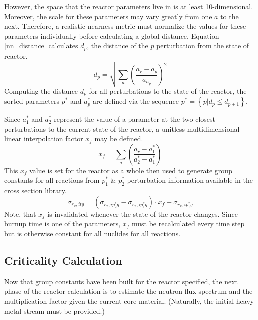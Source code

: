 However, the space that the reactor parameters live in is at least 10-dimensional.  Moreover, 
the scale for these parameters may vary greatly from one $a$ to the next.  Therefore, a realistic
nearness metric must normalize the values for these parameters individually before calculating a
global distance.  Equation \ref{nn_distance} calculates $d_p$, the distance of the $p$ 
perturbation from the state of reactor.
\begin{equation}
\label{nn_distance}
d_p = \sqrt{\sum_a \left(\frac{a_r - a_p}{a_{n_p}}\right)^2}
\end{equation}
Computing the distance $d_p$ for all perturbations to the state of the reactor, 
the sorted parameters $p^*$ and $a_p^*$ are defined via the sequence $p^* = \left\{p | d_p \le d_{p+1}\right\}$.

Since $a_1^*$ and $a_2^*$ represent the value of a parameter at the two closest perturbations to the
current state of the reactor, a unitless multidimensional linear interpolation factor $x_f$ may be defined.
\begin{equation}
\label{x_factor}
x_f = \sum_a \left(\frac{a_r - a_1^*}{a_2^* - a_1^*}\right)
\end{equation}
This $x_f$ value is set for the reactor as a whole then used to generate group constants for 
all reactions from $p_1^*$ \& $p_2^*$ perturbation information available in the cross section library. 
\begin{equation}
\label{sig_multi_interp}
\sigma_{r_x,itg} = (\sigma_{r_x,ip_2^*g} - \sigma_{r_x,ip_1^*g}) \cdot x_f  + \sigma_{r_x,ip_1^*g}
\end{equation}
Note, that $x_f$ is invalidated whenever the state of the reactor changes.  Since burnup time is one of 
the parameters, $x_f$ must be recalculated every time step but is otherwise constant for all nuclides
for all reactions.


\subsection{Criticality Calculation}
\label{mg_sec:crit_calc}
Now that group constants have been built for the reactor specified, the next phase of the reactor 
calculation is to estimate the neutron flux spectrum and the multiplication factor given the current 
core material. (Naturally, the initial heavy metal stream must be provided.)

